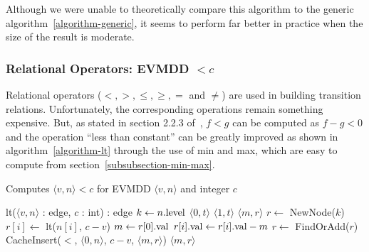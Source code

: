 \documentclass[a4paper,oneside,11pt,pdftex]{llncs}
\newcommand{\BLANK}{\STATE \vspace{-0.6em}}
\newcommand{\edge}[2]{\langle #1, #2 \rangle}
\newcommand{\val}[1]{#1{\rm .val}}
\newcommand{\level}[1]{#1{\rm .level}}
\begin{document}
Although we were unable to theoretically compare this algorithm to
the generic algorithm~\vref{algorithm-generic}, it seems to perform
far better in practice when the size of the result is moderate.

\subsubsection{Relational Operators: EVMDD $< c$}

Relational operators ($<, >, \leq, \geq, =$ and $\neq$) are
used in building transition relations.
Unfortunately, the corresponding operations remain something expensive.
But, as stated in section
2.2.3 of~\cite{Lai1996}, $f < g$ can be computed as $f-g < 0$ and
the operation ``less than constant'' can be greatly improved
as shown in algorithm~\vref{algorithm-lt} through
the use of min and max, which are easy to compute from section~\vref{subsubsection-min-max}.
\begin{algorithm}[htbp]
  \caption{Computes $\edge{v}{n} < c$ for EVMDD $\edge{v}{n}$ and integer $c$}
  \label{algorithm-lt}
  \begin{algorithmic}
    \item[lt($\edge{v}{n}$ : edge, $c$ : int) : edge]
    \STATE $k \gets \level{n}$
    \BLANK
    \STATE {}
      \RETURN $\edge{0}{t}$ 
    \ENDIF
      \RETURN $\edge{1}{t}$ 
    \ENDIF
    \BLANK
    \STATE {}
    \IF{CacheFind($<$, $\edge{0}{n}$, $c-v$, $\edge{m}{r}$)}
      \RETURN $\edge{m}{r}$
    \ENDIF
    \BLANK
    \STATE $r \gets$ NewNode($k$)
      \STATE $r[i] \gets$ lt($n[i]$, $c-v$)
    \ENDFOR
    \STATE $m \gets \val{r[0]}$
      \STATE $\val{r[i]} \gets \val{r[i]}-m$
    \ENDFOR
    \BLANK
    \STATE {}
    \STATE $r \gets$ FindOrAdd($r$)
    \BLANK
    \STATE {}
    \STATE CacheInsert($<$, $\edge{0}{n}$, $c-v$, $\edge{m}{r}$)
    \BLANK
    \RETURN $\edge{m}{r}$
  \end{algorithmic}
\end{algorithm}
\end{document}

